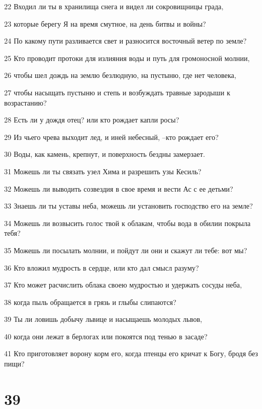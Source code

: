 \par 22 Входил ли ты в хранилища снега и видел ли сокровищницы града,
\par 23 которые берегу Я на время смутное, на день битвы и войны?
\par 24 По какому пути разливается свет и разносится восточный ветер по земле?
\par 25 Кто проводит протоки для излияния воды и путь для громоносной молнии,
\par 26 чтобы шел дождь на землю безлюдную, на пустыню, где нет человека,
\par 27 чтобы насыщать пустыню и степь и возбуждать травные зародыши к возрастанию?
\par 28 Есть ли у дождя отец? или кто рождает капли росы?
\par 29 Из чьего чрева выходит лед, и иней небесный, --кто рождает его?
\par 30 Воды, как камень, крепнут, и поверхность бездны замерзает.
\par 31 Можешь ли ты связать узел Хима и разрешить узы Кесиль?
\par 32 Можешь ли выводить созвездия в свое время и вести Ас с ее детьми?
\par 33 Знаешь ли ты уставы неба, можешь ли установить господство его на земле?
\par 34 Можешь ли возвысить голос твой к облакам, чтобы вода в обилии покрыла тебя?
\par 35 Можешь ли посылать молнии, и пойдут ли они и скажут ли тебе: вот мы?
\par 36 Кто вложил мудрость в сердце, или кто дал смысл разуму?
\par 37 Кто может расчислить облака своею мудростью и удержать сосуды неба,
\par 38 когда пыль обращается в грязь и глыбы слипаются?
\par 39 Ты ли ловишь добычу львице и насыщаешь молодых львов,
\par 40 когда они лежат в берлогах или покоятся под тенью в засаде?
\par 41 Кто приготовляет ворону корм его, когда птенцы его кричат к Богу, бродя без пищи?

\chapter{39}

